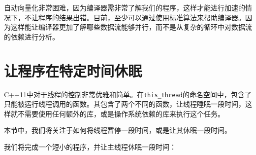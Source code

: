 自动向量化非常困难，因为编译器需非常了解我们的程序，这样才能进行加速的情况下，不让程序的结果出错。目前，至少可以通过使用标准算法来帮助编译器。因为这样能让编译器更加了解哪些数据流能够并行，而不是从复杂的循环中对数据流的依赖进行分析。


\section{让程序在特定时间休眠}

C++11中对于线程的控制非常优雅和简单。在\texttt{this\_thread}的命名空间中，包含了只能被运行线程调用的函数。其包含了两个不同的函数，让线程睡眠一段时间，这样就不需要使用任何额外的库，或是操作系统依赖的库来执行这个任务。

本节中，我们将关注于如何将线程暂停一段时间，或是让其休眠一段时间。


我们将完成一个短小的程序，并让主线程休眠一段时间：

